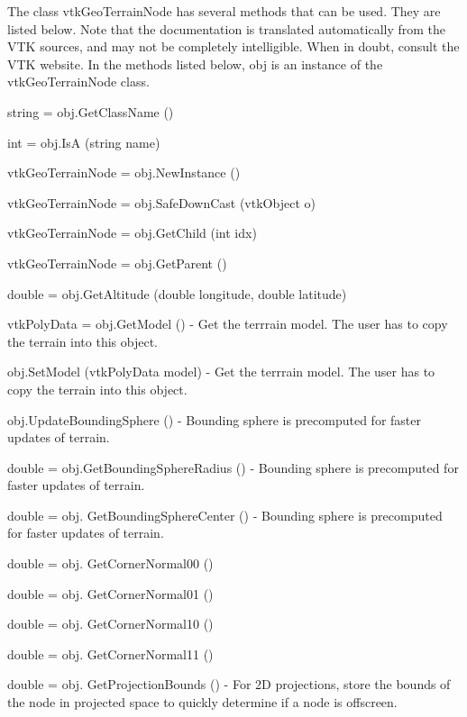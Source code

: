 The class vtk\-Geo\-Terrain\-Node has several methods that can be used. They are listed below. Note that the documentation is translated automatically from the V\-T\-K sources, and may not be completely intelligible. When in doubt, consult the V\-T\-K website. In the methods listed below, {\ttfamily obj} is an instance of the vtk\-Geo\-Terrain\-Node class. 
\begin{DoxyItemize}
\item {\ttfamily string = obj.\-Get\-Class\-Name ()}  
\item {\ttfamily int = obj.\-Is\-A (string name)}  
\item {\ttfamily vtk\-Geo\-Terrain\-Node = obj.\-New\-Instance ()}  
\item {\ttfamily vtk\-Geo\-Terrain\-Node = obj.\-Safe\-Down\-Cast (vtk\-Object o)}  
\item {\ttfamily vtk\-Geo\-Terrain\-Node = obj.\-Get\-Child (int idx)}  
\item {\ttfamily vtk\-Geo\-Terrain\-Node = obj.\-Get\-Parent ()}  
\item {\ttfamily double = obj.\-Get\-Altitude (double longitude, double latitude)}  
\item {\ttfamily vtk\-Poly\-Data = obj.\-Get\-Model ()} -\/ Get the terrrain model. The user has to copy the terrain into this object.  
\item {\ttfamily obj.\-Set\-Model (vtk\-Poly\-Data model)} -\/ Get the terrrain model. The user has to copy the terrain into this object.  
\item {\ttfamily obj.\-Update\-Bounding\-Sphere ()} -\/ Bounding sphere is precomputed for faster updates of terrain.  
\item {\ttfamily double = obj.\-Get\-Bounding\-Sphere\-Radius ()} -\/ Bounding sphere is precomputed for faster updates of terrain.  
\item {\ttfamily double = obj. Get\-Bounding\-Sphere\-Center ()} -\/ Bounding sphere is precomputed for faster updates of terrain.  
\item {\ttfamily double = obj. Get\-Corner\-Normal00 ()}  
\item {\ttfamily double = obj. Get\-Corner\-Normal01 ()}  
\item {\ttfamily double = obj. Get\-Corner\-Normal10 ()}  
\item {\ttfamily double = obj. Get\-Corner\-Normal11 ()}  
\item {\ttfamily double = obj. Get\-Projection\-Bounds ()} -\/ For 2\-D projections, store the bounds of the node in projected space to quickly determine if a node is offscreen.  

\end{DoxyItemize}
